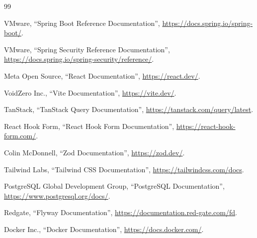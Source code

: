 \begin{thebibliography}{99}
\sloppy
{}

VMware, ``Spring Boot Reference Documentation'', \url{https://docs.spring.io/spring-boot/}.

VMware, ``Spring Security Reference Documentation'', \url{https://docs.spring.io/spring-security/reference/}.

Meta Open Source, ``React Documentation'', \url{https://react.dev/}.

VoidZero Inc., ``Vite Documentation'', \url{https://vite.dev/}.

TanStack, ``TanStack Query Documentation'', \url{https://tanstack.com/query/latest}.

React Hook Form, ``React Hook Form Documentation'', \url{https://react-hook-form.com/}.

Colin McDonnell, ``Zod Documentation'', \url{https://zod.dev/}.

Tailwind Labs, ``Tailwind CSS Documentation'', \url{https://tailwindcss.com/docs}.

PostgreSQL Global Development Group, ``PostgreSQL Documentation'', \url{https://www.postgresql.org/docs/}.

Redgate, ``Flyway Documentation'', \url{https://documentation.red-gate.com/fd}.

Docker Inc., ``Docker Documentation'', \url{https://docs.docker.com/}.

\end{thebibliography}
